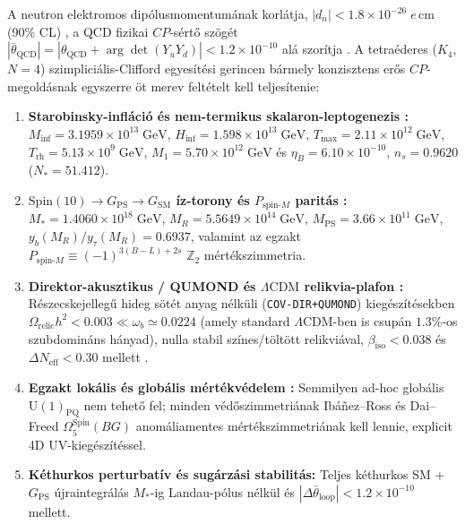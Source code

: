 \documentclass[11pt,a4paper]{article}
\begin{document}
A neutron elektromos dipólusmomentumának korlátja, $|d_n| < 1.8\times 10^{-26}\;e\,\mathrm{cm}$ (90\% CL) \cite{Abel2020nEDM,PDG2024}, a QCD fizikai $CP$-sértő szögét $|\bar{\theta}_{\mathrm{QCD}}| = |\theta_{\mathrm{QCD}} + \arg\det(Y_u Y_d)| < 1.2\times 10^{-10}$ alá szorítja \cite{tHooft1976,JackiwRebbi1976,CallanDashenGross1976,PospelovRitz2005}. A tetraéderes ($K_4$, $N = 4$) szimpliciális-Clifford egyesítési gerincen \cite{Olcsak2026Zenodo,Olcsak2026Paper23,Olcsak2026Paper24,Olcsak2026Paper25} bármely konzisztens erős $CP$-megoldásnak egyszerre öt merev feltételt kell teljesítenie:
\begin{enumerate}[label=\textbf{(C\arabic*)},leftmargin=2.4em,itemsep=2pt]
\item \textbf{Starobinsky-infláció és nem-termikus skalaron-leptogenezis \cite{Starobinsky1980,Whitt1984,Olcsak2026Paper24}:} $M_{\mathrm{inf}} = 3.1959\times 10^{13}\;\mathrm{GeV}$, $H_{\mathrm{inf}} = 1.598\times 10^{13}\;\mathrm{GeV}$, $T_{\max} = 2.11\times 10^{12}\;\mathrm{GeV}$, $T_{\mathrm{rh}} = 5.13\times 10^9\;\mathrm{GeV}$, $M_1 = 5.70\times 10^{12}\;\mathrm{GeV}$ és $\eta_B = 6.10\times 10^{-10}$, $n_s = 0.9620$ ($N_* = 51.412$).
\item \textbf{$\mathrm{Spin}(10) \to G_{\mathrm{PS}} \to G_{\mathrm{SM}}$ íz-torony és $P_{\mathrm{spin}\text{-}M}$ paritás \cite{Olcsak2026Paper25}:} $M_* = 1.4060\times 10^{18}\;\mathrm{GeV}$, $M_R = 5.5649\times 10^{14}\;\mathrm{GeV}$, $M_{\mathrm{PS}} = 3.66\times 10^{11}\;\mathrm{GeV}$, $y_b(M_R)/y_\tau(M_R) = 0.6937$, valamint az egzakt $P_{\mathrm{spin}\text{-}M} \equiv (-1)^{3(B-L)+2s}$ $\mathbb{Z}_2$ mértékszimmetria.
\item \textbf{Direktor-akusztikus / QUMOND és $\Lambda\mathrm{CDM}$ relikvia-plafon \cite{Milgrom2010QUMOND,Olcsak2026Zenodo,Olcsak2026Paper23}:} Részecskejellegű hideg sötét anyag nélküli (\texttt{COV-DIR+QUMOND}) kiegészítésekben $\Omega_{\mathrm{relic}}h^2 < 0.003 \ll \omega_b \simeq 0.0224$ (amely standard $\Lambda\mathrm{CDM}$-ben is csupán $1.3\%$-os szubdomináns hányad), nulla stabil színes/töltött relikviával, $\beta_{\mathrm{iso}} < 0.038$ és $\Delta N_{\mathrm{eff}} < 0.30$ mellett \cite{Planck2018Inflation,Planck2018Cosmo}.
\item \textbf{Egzakt lokális és globális mértékvédelem \cite{IbanezRoss1991,Hsieh2018,GarciaEtxebarriaMontero2019}:} Semmilyen ad-hoc globális $\mathrm{U}(1)_{\mathrm{PQ}}$ nem tehető fel; minden védőszimmetriának Ibáñez--Ross és Dai--Freed $\Omega_5^{\mathrm{Spin}}(BG)$ anomáliamentes mértékszimmetriának kell lennie, explicit 4D UV-kiegészítéssel.
\item \textbf{Kéthurkos perturbatív és sugárzási stabilitás:} Teljes kéthurkos SM + $G_{\mathrm{PS}}$ újraintegrálás $M_*$-ig Landau-pólus nélkül és $|\Delta\bar{\theta}_{\mathrm{loop}}| < 1.2\times 10^{-10}$ mellett.
\end{enumerate}
\end{document}
